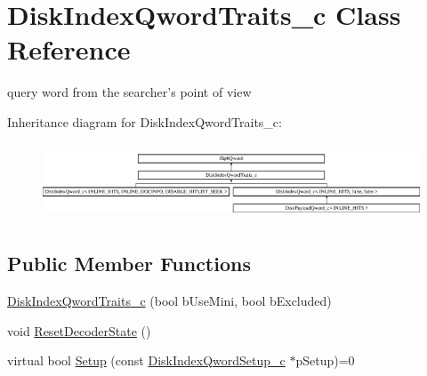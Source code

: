 \hypertarget{classDiskIndexQwordTraits__c}{\section{Disk\-Index\-Qword\-Traits\-\_\-c Class Reference}
\label{classDiskIndexQwordTraits__c}
}


query word from the searcher's point of view  


Inheritance diagram for Disk\-Index\-Qword\-Traits\-\_\-c\-:\begin{figure}[H]
\begin{center}
\leavevmode
\includegraphics[height=2.299795cm]{classDiskIndexQwordTraits__c}
\end{center}
\end{figure}
\subsection*{Public Member Functions}
\begin{DoxyCompactItemize}
\item 
\hyperlink{classDiskIndexQwordTraits__c_acfe137b781cb0f39ac72d8031362fa35}{Disk\-Index\-Qword\-Traits\-\_\-c} (bool b\-Use\-Mini, bool b\-Excluded)
\item 
void \hyperlink{classDiskIndexQwordTraits__c_addb59eaae65bddf58231211ba674cf08}{Reset\-Decoder\-State} ()
\item 
virtual bool \hyperlink{classDiskIndexQwordTraits__c_a667e9f2f2c6830de427f1d7054c62091}{Setup} (const \hyperlink{classDiskIndexQwordSetup__c}{Disk\-Index\-Qword\-Setup\-\_\-c} $\ast$p\-Setup)=0
\end{DoxyCompactItemize}
